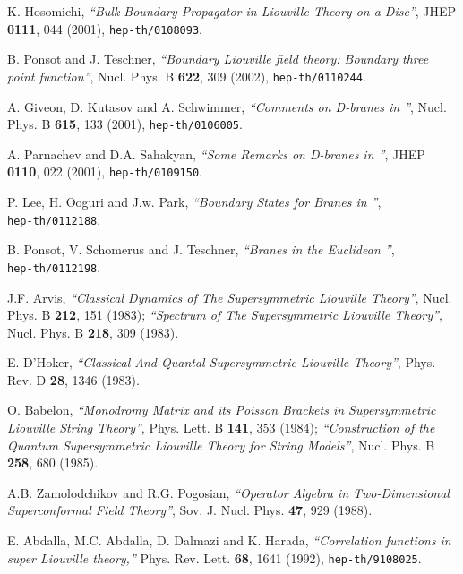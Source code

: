 \documentclass[a4paper,12pt]{article}
\begin{document}
 K. Hosomichi,
    {\sl ``Bulk-Boundary Propagator in Liouville Theory on a Disc''},
    JHEP {\bf 0111}, 044 (2001),
    {\tt hep-th/0108093}.

 B. Ponsot and J. Teschner,
    {\sl ``Boundary Liouville field theory: Boundary three point function''},
    Nucl. Phys. B {\bf 622}, 309 (2002),
    {\tt hep-th/0110244}.

 A. Giveon, D. Kutasov and A. Schwimmer,
    {\sl ``Comments on D-branes in \coordHE{}''},
    Nucl. Phys. B {\bf 615}, 133 (2001),
    {\tt hep-th/0106005}.

 A. Parnachev and D.A. Sahakyan,
    {\sl ``Some Remarks on D-branes in \coordHE{}''},
    JHEP {\bf 0110}, 022 (2001),
    {\tt hep-th/0109150}.

 P. Lee, H. Ooguri and J.w. Park,
    {\sl ``Boundary States for \coordHE{} Branes in \coordHE{}''},\\
    {\tt hep-th/0112188}.

 B. Ponsot, V. Schomerus and J. Teschner,
    {\sl ``Branes in the Euclidean \coordHE{}''},\\
    {\tt hep-th/0112198}.

 J.F. Arvis,
    {\sl ``Classical Dynamics of The Supersymmetric Liouville Theory''},
    Nucl. Phys. B {\bf 212}, 151 (1983);
    {\sl ``Spectrum of The Supersymmetric Liouville Theory''},
    Nucl. Phys. B {\bf 218}, 309 (1983).

 E. D'Hoker,
    {\sl ``Classical And Quantal Supersymmetric Liouville Theory''},
    Phys. Rev. D {\bf 28}, 1346 (1983).

 O. Babelon,
    {\sl ``Monodromy Matrix and its Poisson Brackets
           in Supersymmetric Liouville String Theory''},
    Phys. Lett. B {\bf 141}, 353 (1984);
    {\sl ``Construction of the Quantum Supersymmetric Liouville Theory
           for String Models''},
    Nucl. Phys. B {\bf 258}, 680 (1985).

 A.B. Zamolodchikov and R.G. Pogosian,
    {\sl ``Operator Algebra in Two-Dimensional Superconformal Field Theory''},
    Sov. J. Nucl. Phys. {\bf 47}, 929 (1988).

 E. Abdalla, M.C. Abdalla, D. Dalmazi and K. Harada,
    {\sl ``Correlation functions in super Liouville theory,''}
    Phys. Rev. Lett. {\bf 68}, 1641 (1992),
    {\tt hep-th/9108025}.
\end{document}
